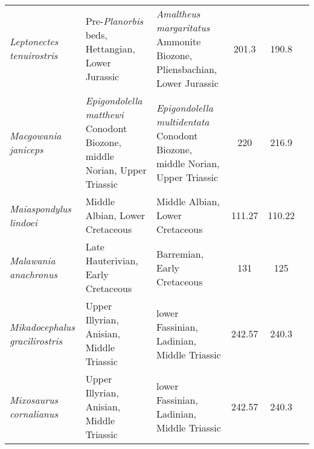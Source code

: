 \begin{longtabu}{>{\itshape}lXXSSl}
	Leptonectes tenuirostris                             & Pre-\emph{Planorbis} beds, Hettangian, Lower Jurassic                                                                              & \emph{Amaltheus margaritatus} Ammonite Biozone, Pliensbachian, Lower Jurassic                                                      & 201.3                    & 190.8                    & \cite{McGowan1989,McGowan2003} \\        
	Macgowania janiceps                                  & \emph{Epigondolella matthewi} Conodont Biozone, middle Norian, Upper Triassic                                                      & \emph{Epigondolella multidentata} Conodont Biozone, middle Norian, Upper Triassic                                                  & 220                      & 216.9                    & \cite{McGowan1996} \\                    
	Maiaspondylus lindoei                                & Middle Albian, Lower Cretaceous                                                                                                    & Middle Albian, Lower Cretaceous                                                                                                    & 111.27                   & 110.22                   & \cite{Maxwell2006a} \\                   
	Malawania anachronus                                 & Late Hauterivian, Early Cretaceous                                                                                                 & Barremian, Early Cretaceous                                                                                                        & 131                      & 125                      & \cite{Fischer2013a} \\                   
	Mikadocephalus gracilirostris                        & Upper Illyrian, Anisian, Middle Triassic                                                                                           & lower Fassinian, Ladinian, Middle Triassic                                                                                         & 242.57                   & 240.3                    & \cite{Maisch1997c} \\                    
	Mixosaurus cornalianus                               & Upper Illyrian, Anisian, Middle Triassic                                                                                           & lower Fassinian, Ladinian, Middle Triassic                                                                                         & 242.57                   & 240.3                    & \cite{Repossi1902,McGowan2003} \\        

\end{longtabu}
